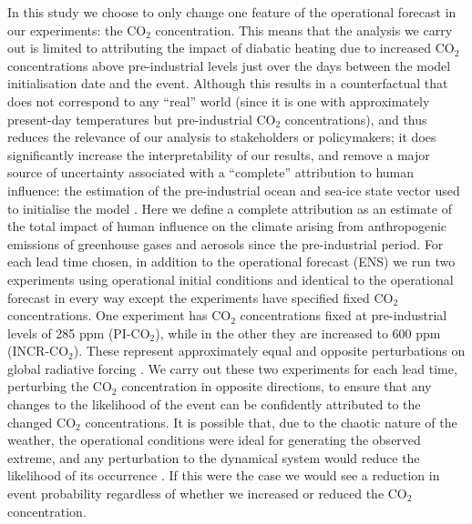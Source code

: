   In this study we choose to only change one feature of the operational forecast in our experiments: the CO$_2$ concentration. This means that the analysis we carry out is limited to attributing the impact of diabatic heating due to increased CO$_2$ concentrations above pre-industrial levels just over the days between the model initialisation date and the event. Although this results in a counterfactual that does not correspond to any ``real'' world (since it is one with approximately present-day temperatures but pre-industrial CO$_2$ concentrations), and thus reduces the relevance of our analysis to stakeholders or policymakers; it does significantly increase the interpretability of our results, and remove a major source of uncertainty associated with a “complete” attribution to human influence: the estimation of the pre-industrial ocean and sea-ice state vector used to initialise the model \citep{stone_benchmark_2021}. Here we define a complete attribution as an estimate of the total impact of human influence on the climate arising from anthropogenic emissions of greenhouse gases and aerosols since the pre-industrial period. For each lead time chosen, in addition to the operational forecast (ENS) we run two experiments using operational initial conditions and identical to the operational forecast in every way except the experiments have specified fixed CO$_2$ concentrations. One experiment has CO$_2$ concentrations fixed at pre-industrial levels of 285 ppm (PI-CO$_2$), while in the other they are increased to 600 ppm (INCR-CO$_2$). These represent approximately equal and opposite perturbations on global radiative forcing \citep{etminan_radiative_2016}. We carry out these two experiments for each lead time, perturbing the CO$_2$ concentration in opposite directions, to ensure that any changes to the likelihood of the event can be confidently attributed to the changed CO$_2$ concentrations. It is possible that, due to the chaotic nature of the weather, the operational conditions were ideal for generating the observed extreme, and any perturbation to the dynamical system would reduce the likelihood of its occurrence \citep{shepherd_common_2016}. If this were the case we would see a reduction in event probability regardless of whether we increased or reduced the CO$_2$ concentration.
  
